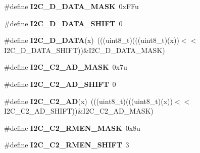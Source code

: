 \begin{DoxyCompactItemize}
\item 
\#define {\bfseries I2\+C\+\_\+\+D\+\_\+\+D\+A\+T\+A\+\_\+\+M\+A\+SK}~0x\+F\+Fu\hypertarget{group__I2C__Register__Masks_gaeb11bc3736eba5b805bdc4bced7edb2e}{}\label{group__I2C__Register__Masks_gaeb11bc3736eba5b805bdc4bced7edb2e}

\item 
\#define {\bfseries I2\+C\+\_\+\+D\+\_\+\+D\+A\+T\+A\+\_\+\+S\+H\+I\+FT}~0\hypertarget{group__I2C__Register__Masks_gac9b220edf37227949c367bf455d11a04}{}\label{group__I2C__Register__Masks_gac9b220edf37227949c367bf455d11a04}

\item 
\#define {\bfseries I2\+C\+\_\+\+D\+\_\+\+D\+A\+TA}(x)~(((uint8\+\_\+t)(((uint8\+\_\+t)(x))$<$$<$I2\+C\+\_\+\+D\+\_\+\+D\+A\+T\+A\+\_\+\+S\+H\+I\+FT))\&I2\+C\+\_\+\+D\+\_\+\+D\+A\+T\+A\+\_\+\+M\+A\+SK)\hypertarget{group__I2C__Register__Masks_ga7b68b1d5f1aa40f4bc5e9310e0a63754}{}\label{group__I2C__Register__Masks_ga7b68b1d5f1aa40f4bc5e9310e0a63754}

\item 
\#define {\bfseries I2\+C\+\_\+\+C2\+\_\+\+A\+D\+\_\+\+M\+A\+SK}~0x7u\hypertarget{group__I2C__Register__Masks_ga6c5f8db3bac4c51de9446448a8ad9072}{}\label{group__I2C__Register__Masks_ga6c5f8db3bac4c51de9446448a8ad9072}

\item 
\#define {\bfseries I2\+C\+\_\+\+C2\+\_\+\+A\+D\+\_\+\+S\+H\+I\+FT}~0\hypertarget{group__I2C__Register__Masks_gab875d484e12dc6ae427c2063430d1362}{}\label{group__I2C__Register__Masks_gab875d484e12dc6ae427c2063430d1362}

\item 
\#define {\bfseries I2\+C\+\_\+\+C2\+\_\+\+AD}(x)~(((uint8\+\_\+t)(((uint8\+\_\+t)(x))$<$$<$I2\+C\+\_\+\+C2\+\_\+\+A\+D\+\_\+\+S\+H\+I\+FT))\&I2\+C\+\_\+\+C2\+\_\+\+A\+D\+\_\+\+M\+A\+SK)\hypertarget{group__I2C__Register__Masks_gaa19edf20551c0d4dc70b840c2c5b7e24}{}\label{group__I2C__Register__Masks_gaa19edf20551c0d4dc70b840c2c5b7e24}

\item 
\#define {\bfseries I2\+C\+\_\+\+C2\+\_\+\+R\+M\+E\+N\+\_\+\+M\+A\+SK}~0x8u\hypertarget{group__I2C__Register__Masks_ga70911373d5619a4d8376777446085856}{}\label{group__I2C__Register__Masks_ga70911373d5619a4d8376777446085856}

\item 
\#define {\bfseries I2\+C\+\_\+\+C2\+\_\+\+R\+M\+E\+N\+\_\+\+S\+H\+I\+FT}~3\hypertarget{group__I2C__Register__Masks_ga802a10e2d279895ec0230b4701b1a4bf}{}\label{group__I2C__Register__Masks_ga802a10e2d279895ec0230b4701b1a4bf}


\end{DoxyCompactItemize}
